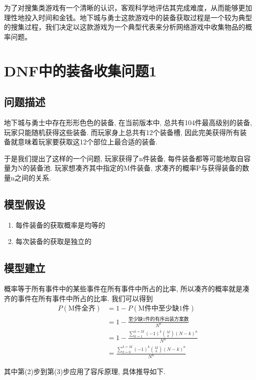 \documentclass[10pt,journal,compsoc]{IEEEtran}
\begin{document}
  为了对搜集类游戏有一个清晰的认识，客观科学地评估其完成难度，从而能够更加理性地投入时间和金钱。地下城与勇士这款游戏中的装备获取过程是一个较为典型的搜集过程，我们决定以这款游戏为一个典型代表来分析网络游戏中收集物品的概率问题。

\section{DNF中的装备收集问题1}

  \subsection{问题描述}
    地下城与勇士中存在形形色色的装备, 在当前版本中, 总共有104件最高级别的装备, 玩家只能随机获得这些装备. 而玩家身上总共有12个装备槽, 因此完美获得所有装备就意味着玩家要获取这12个部位上最合适的装备.

    于是我们提出了这样的一个问题, 玩家获得了n件装备, 每件装备都等可能地取自容量为N的装备池. 玩家想凑齐其中指定的M件装备, 求凑齐的概率P与获得装备的数量n之间的关系.

  \subsection{模型假设}
    \begin{enumerate}
      \item 每件装备的获取概率是均等的
      \item 每次装备的获取是独立的
    \end{enumerate}

  \subsection{模型建立}
    概率等于所有事件中的某些事件在所有事件中所占的比率, 所以凑齐的概率就是凑齐的事件在所有事件中所占的比率. 我们可以得到
    \begin{align}
      P(\text{M件全齐}) &= 1-P(\text{M件中至少缺1件})\\
      &= 1-\frac{\text{至少缺1件的有序出装方案数}}{N^n}\\
      &= 1-\frac{\sum_{k=1}^{k=M}(-1)^k\binom{M}{k}(N-k)^n}{N^n}\\
      &= \frac{\sum_{k=0}^{k=M}(-1)^k\binom{M}{k}(N-k)^n}{N^n}
    \end{align}
    
    其中第(2)步到第(3)步应用了容斥原理, 具体推导如下.
    
\end{document}
